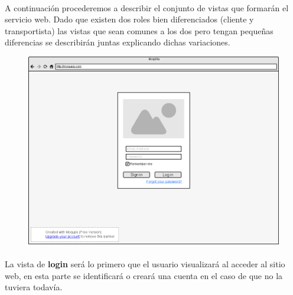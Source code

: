 \documentclass[10pt, a4paper,spanish]{article}
\begin{document}
			\paragraph{}
			A continuación procederemos a describir el conjunto de vistas que formarán el servicio web. Dado que existen dos roles bien diferenciados (cliente y transportista) las vistas que sean comunes a los dos pero tengan pequeñas diferencias se describirán juntas explicando dichas variaciones.

			\begin{figure}[H]
				\centering
				\begin{minipage}[b]{0.8\textwidth}
					\includegraphics[width=\textwidth]{res/Login.png}
				\end{minipage}
			\end{figure}

			\paragraph{}
			La vista de \textbf{login} será lo primero que el usuario visualizará al acceder al sitio web, en esta parte se identificará o creará una cuenta en el caso de que no la tuviera todavía.
\end{document}
